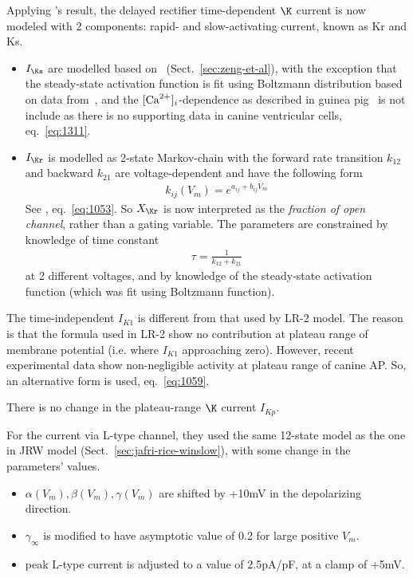 Applying \citep{zeng1995}'s result, the delayed rectifier time-dependent $\K$
current is now modeled with 2 components: rapid- and slow-activating current,
known as Kr and Ks.
\begin{itemize}
\item $I_\Ks$ are modelled based on~\citep{zeng1995}
  (Sect.~\ref{sec:zeng-et-al}), with the exception that the
  steady-state activation function is fit using Boltzmann distribution
  based on data from~\citep{liu1995cdr}, and the $[{\text{Ca}^{2+}}]_i$-dependence
  as described in guinea pig~\citep{zeng1995} is not include as there
  is no supporting data in canine ventricular cells,
  eq.~\eqref{eq:1311}.

\item $I_\Kr$ is modelled as 2-state Markov-chain with the forward rate
  transition $k_{12}$ and backward $k_{21}$ are voltage-dependent and
  have the following form
  \begin{eqnarray}
    \label{eq:1056}
    k_{ij}(V_m) = e^{a_{ij}+b_{ij}V_m}
  \end{eqnarray}
  See , eq.~\eqref{eq:1053}.  So $X_\Kr$ is now interpreted as the
  {\it fraction of open channel}, rather than a gating variable.  The
  parameters are constrained by knowledge of time constant
  \begin{eqnarray}
    \label{eq:1057}
    \tau = \frac{1}{k_{12}+k_{21}}
  \end{eqnarray}
  at 2 different voltages, and by knowledge of the steady-state
  activation function (which was fit using Boltzmann function). 
\end{itemize}

The time-independent $I_{K1}$ is different from that used by LR-2 model. The
reason is that the formula used in LR-2 show no contribution at plateau range of
membrane potential (i.e. where $I_{K1}$ approaching zero). However,
recent experimental data show non-negligible activity at plateau range of
canine AP. So, an alternative form is used, eq.~\eqref{eq:1059}.

There is no change in the plateau-range $\K$ current $I_{Kp}$.

For the current via L-type channel, they used the same 12-state model
as the one in JRW model (Sect.~\ref{sec:jafri-rice-winslow}), with
some change in the parameters' values.
\begin{itemize}
\item $\alpha(V_m),\beta(V_m),\gamma(V_m)$ are shifted by +10mV in the
  depolarizing direction.

\item $\gamma_\infty$ is modified to have asymptotic value of 0.2 for
  large positive $V_m$. 

\item peak L-type current is adjusted to a value of 2.5pA/pF, at a
  clamp of +5mV. 
\end{itemize}

